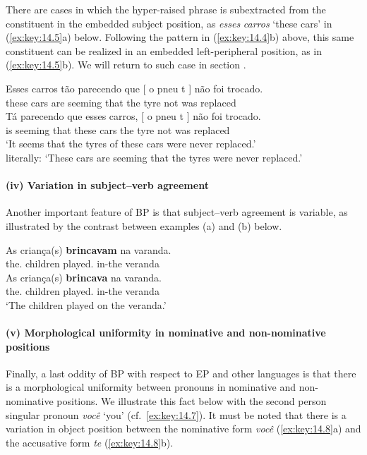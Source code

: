 \documentclass[output=paper]{langsci/langscibook}
\begin{document}
There are cases in which the hyper-raised phrase is subextracted from the
constituent in the embedded subject position, as \emph{esses} \emph{carros}
‘these cars’ in (\ref{ex:key:14.5}a) below. Following the pattern in (\ref{ex:key:14.4}b)
above, this same constituent can be realized in an embedded left-peripheral
position, as in (\ref{ex:key:14.5}b). We will return to such case in section
.

\ea\label{ex:key:14.5}
    \ea
	\gll    Esses carros tão parecendo que [ o pneu t ] não foi trocado.\\
            these cars are seeming that {} the tyre {} {} not was replaced\\
    \ex
    \gll    Tá parecendo que esses carros, [ o pneu t ] não foi trocado.\\
            is seeming that these cars {} the tyre {} {} not was replaced\\
    \glt    ‘It seems that the tyres of these cars were never replaced.’\\
            literally: ‘These cars are seeming that the tyres were never replaced.’
    \z
\z

\paragraph*{(iv) Variation in subject--verb agreement}

Another important feature of \gls{BP} is that subject--verb agreement is
variable, as illustrated by the contrast between examples (a) and (b) below.

\ea%
    \label{ex:key:14.6}
	\ea
	\gll    As criança(s) \textbf{brincavam} na varanda.\\
            the.\Pl{}  children played.\Tpl{} in-the veranda\\
    \ex
    \gll    As criança(s) \textbf{brincava} na varanda.\\
            the.\Pl{}  children played.\Tsg{} in-the veranda\\
    \glt    ‘The children played on the veranda.’
    \z
\z

\paragraph*{(v) Morphological uniformity in nominative and non-nominative positions}

Finally, a last oddity of \gls{BP} with respect to \gls{EP} and other 
languages is that there is a morphological uniformity between pronouns in
nominative and non-nominative positions. We illustrate this fact below with the
second person singular pronoun \emph{você} ‘you’ (cf.\ \eqref{ex:key:14.7}). It
must be noted that there is a variation in object position between the
nominative form \emph{você} (\ref{ex:key:14.8}a) and the accusative form
\emph{te} (\ref{ex:key:14.8}b).
\end{document}
